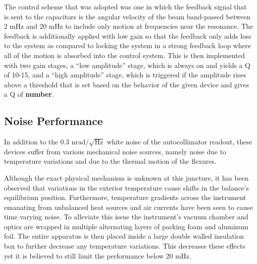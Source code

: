 \documentclass [12pt, proquest]{uwthesis}[2019]
\begin{document}
The control scheme that was adopted was one in which the feedback signal that is sent to the capacitors is the angular velocity of the beam band-passed between 2 mHz and 20 mHz to include only motion at frequencies near the resonance. The feedback is additionally applied with low gain so that the feedback only adds loss to the system as compared to locking the system in a strong feedback loop where all of the motion is absorbed into the control system. This is then implemented with two gain stages, a ``low amplitude'' stage, which is always on and yields a Q of 10-15, and a ``high amplitude'' stage, which is triggered if the amplitude rises above a threshold that is set based on the behavior of the given device and gives a Q of \textbf{number}.

\subsection{Noise Performance}

In addition to the 0.3 nrad/$\sqrt{\text{Hz}}$ white noise of the autocollimator readout, these devices suffer from various mechanical noise sources, namely noise due to temperature variations and due to the thermal motion of the flexures.

Although the exact physical mechanism is unknown at this juncture, it has been observed that variations in the exterior temperature cause shifts in the balance's equilibrium position. Furthermore, temperature gradients across the instrument emanating from unbalanced heat sources and air currents have been seen to cause time varying noise. To alleviate this issue the instrument's vacuum chamber and optics are wrapped in multiple alternating layers of packing foam and aluminum foil. The entire apparatus is then placed inside a large double walled insulation box to further decrease any temperature variations. This decreases these effects yet it is believed to still limit the performance below 20 mHz.
\end{document}
